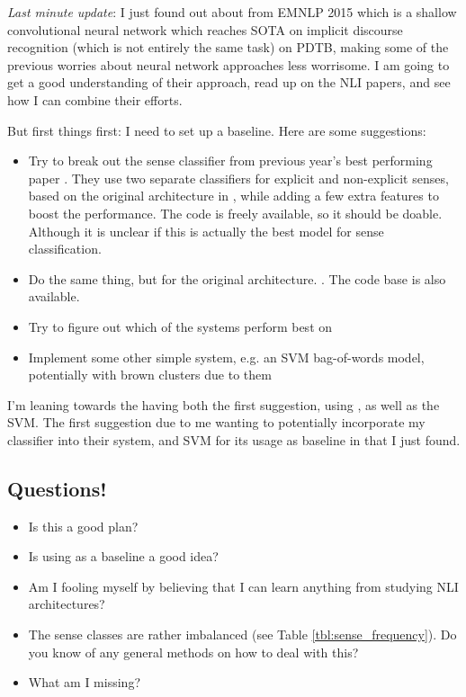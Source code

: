 \emph{Last minute update}: I just found out about \cite{zhang_shallow_2015} from EMNLP 2015 which is a shallow convolutional neural network which reaches SOTA on implicit discourse recognition (which is not entirely the same task) on PDTB, making some of the previous worries about neural network approaches less worrisome. I am going to get a good understanding of their approach, read up on the NLI papers, and see how I can combine their efforts.

But first things first: I need to set up a baseline. Here are some suggestions:

\begin{itemize}
	\item Try to break out the sense classifier from previous year's best performing paper \citep{wang_refined_2015}. They use two separate classifiers for explicit and non-explicit senses, based on the original architecture in \cite{lin_pdtbstyled_2014}, while adding a few extra features to boost the performance. The code is freely available, so it should be doable. Although it is unclear if this is actually the best model for sense classification.
	\item Do the same thing, but for the original architecture. \citep{lin_pdtbstyled_2014}. The code base is also available.
	\item Try to figure out which of the systems perform best on
	\item Implement some other simple system, e.g. an SVM bag-of-words model, potentially with brown clusters due to them
\end{itemize}

I'm leaning towards the having both the first suggestion, using \cite{wang_refined_2015}, as well as the SVM. The first suggestion due to me wanting to potentially incorporate my classifier into their system, and SVM for its usage as baseline in \cite{zhang_shallow_2015} that I just found.

\subsection{Questions!}

\begin{itemize}
	\item Is this a good plan?
	\item Is using \cite{wang_refined_2015} as a baseline a good idea?
	\item Am I fooling myself by believing that I can learn anything from studying NLI architectures?
	\item The sense classes are rather imbalanced (see Table \ref{tbl:sense_frequency}). Do you know of any general methods on how to deal with this?
	\item What am I missing?
\end{itemize}


